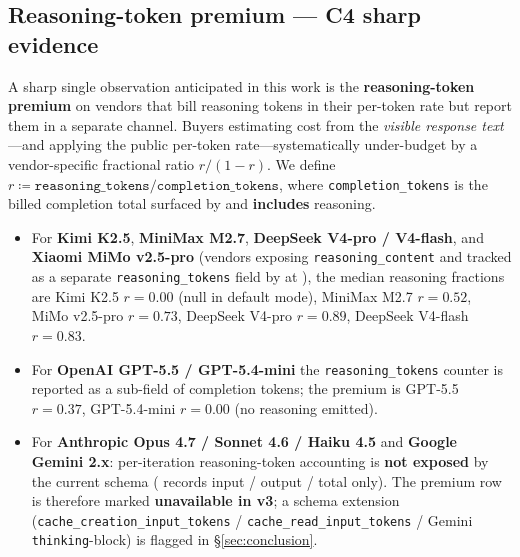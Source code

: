 \subsection{Reasoning-token premium --- C4 sharp evidence}
\label{sec:results-premium}

A sharp single observation anticipated in this work is the
\textbf{reasoning-token premium} on vendors that bill reasoning
tokens in their per-token rate but report them in a separate
channel. Buyers estimating cost from the \emph{visible response
text}---and applying the public per-token rate---systematically
under-budget by a vendor-specific fractional ratio
$r/(1-r)$. We define
$r \coloneqq \texttt{reasoning\_tokens} / \texttt{completion\_tokens}$,
where \texttt{completion\_tokens} is the billed completion total
surfaced by  and \textbf{includes}
reasoning.

\begin{itemize}
  \item For \textbf{Kimi K2.5}, \textbf{MiniMax M2.7},
    \textbf{DeepSeek V4-pro / V4-flash}, and \textbf{Xiaomi MiMo
    v2.5-pro} (vendors exposing \texttt{reasoning\_content} and
    tracked as a separate \texttt{reasoning\_tokens} field by
     at
    ), the median reasoning
    fractions are Kimi K2.5 $r = 0.00$ (null in default mode),
    MiniMax M2.7 $r = 0.52$, MiMo v2.5-pro $r = 0.73$, DeepSeek
    V4-pro $r = 0.89$, DeepSeek V4-flash $r = 0.83$.

  \item For \textbf{OpenAI GPT-5.5 / GPT-5.4-mini} the
    \texttt{reasoning\_tokens} counter is reported as a sub-field
    of completion tokens; the premium is GPT-5.5 $r = 0.37$,
    GPT-5.4-mini $r = 0.00$ (no reasoning emitted).

  \item For \textbf{Anthropic Opus 4.7 / Sonnet 4.6 / Haiku 4.5}
    and \textbf{Google Gemini 2.x}: per-iteration reasoning-token
    accounting is \textbf{not exposed} by the current
     schema
    ( records input / output /
    total only). The premium row is therefore marked
    \textbf{unavailable in v3}; a schema extension
    (\texttt{cache\_creation\_input\_tokens} /
    \texttt{cache\_read\_input\_tokens} / Gemini
    \texttt{thinking}-block) is flagged in \S\ref{sec:conclusion}.
\end{itemize}

